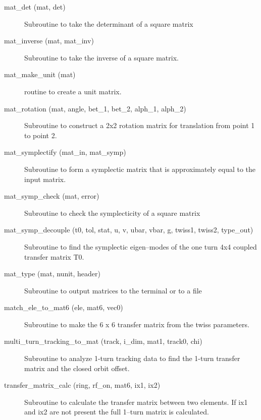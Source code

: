 \begin{description}
\item[mat\_det (mat, det)] \Newline 
     Subroutine to take the determinant of a square matrix

\item[mat\_inverse (mat, mat\_inv)] \Newline
Subroutine to take the inverse of a square matrix. 

\item[mat\_make\_unit (mat)] \Newline 
     routine to create a unit matrix.

\item[mat\_rotation (mat, angle, bet\_1, bet\_2, alph\_1, alph\_2)] \Newline 
     Subroutine to construct a 2x2 rotation matrix for translation from
     point 1 to point 2.

\item[mat\_symplectify (mat\_in, mat\_symp)] \Newline
Subroutine to form a symplectic matrix that is approximately equal to the input matrix. 

\item[mat\_symp\_check (mat, error)] \Newline
Subroutine to check the symplecticity of a square matrix 

\item[mat\_symp\_decouple (t0, tol, stat, u, v, ubar, vbar, g, twiss1, twiss2, type\_out)] \Newline
Subroutine to find the symplectic eigen--modes of the one turn 4x4 coupled 
transfer matrix T0. 

\item[mat\_type (mat, nunit, header)] \Newline 
     Subroutine to output matrices to the terminal or to a file

\item[match\_ele\_to\_mat6 (ele, mat6, vec0)] \Newline 
Subroutine to make the 6 x 6 transfer matrix from the twiss parameters.

\item[multi\_turn\_tracking\_to\_mat (track, i\_dim, mat1, track0, chi)] \Newline
Subroutine to analyze 1-turn tracking data to find the 1-turn transfer matrix 
and the closed orbit offset.

\item[transfer\_matrix\_calc (ring, rf\_on, mat6, ix1, ix2)] \Newline
Subroutine to calculate the transfer matrix between two elements. If
ix1 and ix2 are not present the full 1--turn matrix is calculated.


\end{description}
